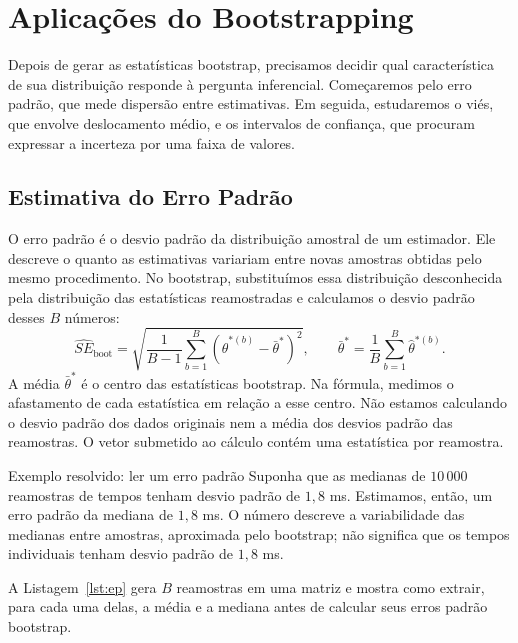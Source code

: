 \documentclass[12pt,a4paper]{article}
\begin{document}
\section{Aplicações do Bootstrapping}
\label{sec:aplicacoes}
Depois de gerar as estatísticas bootstrap, precisamos decidir qual característica de sua distribuição responde à pergunta inferencial. Começaremos pelo erro padrão, que mede dispersão entre estimativas. Em seguida, estudaremos o viés, que envolve deslocamento médio, e os intervalos de confiança, que procuram expressar a incerteza por uma faixa de valores.

\subsection{Estimativa do Erro Padrão}
\label{subsec:ep}
O erro padrão é o desvio padrão da distribuição amostral de um estimador. Ele descreve o quanto as estimativas variariam entre novas amostras obtidas pelo mesmo procedimento. No bootstrap, substituímos essa distribuição desconhecida pela distribuição das estatísticas reamostradas e calculamos o desvio padrão desses $B$ números:
\[
\widehat{SE}_{\mathrm{boot}}=
\sqrt{\frac{1}{B-1}\sum_{b=1}^B
\left(\hat\theta^{*(b)}-\bar\theta^*\right)^2},
\qquad
\bar\theta^*=\frac1B\sum_{b=1}^B\hat\theta^{*(b)}.
\]
A média $\bar\theta^*$ é o centro das estatísticas bootstrap. Na fórmula, medimos o afastamento de cada estatística em relação a esse centro. Não estamos calculando o desvio padrão dos dados originais nem a média dos desvios padrão das reamostras. O vetor submetido ao cálculo contém uma estatística por reamostra.

\begin{exemplobox}{Exemplo resolvido: ler um erro padrão}
Suponha que as medianas de $10\,000$ reamostras de tempos tenham desvio padrão de $1{,}8$ ms. Estimamos, então, um erro padrão da mediana de $1{,}8$ ms. O número descreve a variabilidade das medianas entre amostras, aproximada pelo bootstrap; não significa que os tempos individuais tenham desvio padrão de $1{,}8$ ms.
\end{exemplobox}

A Listagem~\ref{lst:ep} gera $B$ reamostras em uma matriz e mostra como extrair, para cada uma delas, a média e a mediana antes de calcular seus erros padrão bootstrap.
\end{document}
